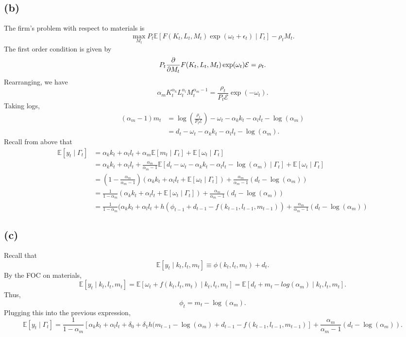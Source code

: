\documentclass[11pt]{article}
\begin{document}
\subsection*{(b)}
The firm's problem with respect to materials is
\[\max_{M_t} P_t \mathbb{E}[F(K_t, L_t, M_t) \exp(\omega_t + \epsilon_t) \mid \Gamma_t] - \rho_t M_t.\]
The first order condition is given by
\[P_t \pdv{M_t} F(K_t, L_t, M_t) \exp(\omega_t) \mathcal{E} = \rho_t.\]
Rearranging, we have
\[\alpha_m K_t^{\alpha_k} L_t^{\alpha_l} M_t^{\alpha_{m} - 1} = \frac{\rho_t}{P_t \mathcal{E}} \exp(-\omega_t).\]
Taking logs,
\begin{align*}
    (\alpha_m - 1) m_t & = \log(\frac{\rho_t}{P_t \mathcal{E}}) - \omega_t - \alpha_k k_t - \alpha_l l_t - \log(\alpha_m) \\
                       & = d_t - \omega_t - \alpha_k k_t - \alpha_l l_t - \log(\alpha_m).
\end{align*} 
Recall from above that
\begin{align*}
    \mathbb{E}[y_t \mid \Gamma_t] & = \alpha_k k_t + \alpha_l l_t + \alpha_m \mathbb{E}[m_t \mid \Gamma_t ] + \mathbb{E}[\omega_t \mid \Gamma_t] \\
                    & = \alpha_k k_t + \alpha_l l_t + \frac{\alpha_m}{\alpha_m - 1} \mathbb{E}[d_t - \omega_t - \alpha_k k_t - \alpha_l l_t - \log(\alpha_m) \mid \Gamma_t] + \mathbb{E}[\omega_t \mid \Gamma_t] \\
                    & = \left( 1 - \frac{\alpha_m}{\alpha_m - 1} \right)(\alpha_k k_t + \alpha_l l_t + \mathbb{E}[\omega_t \mid \Gamma_t]) + \frac{\alpha_m}{\alpha_m - 1} (d_t - \log(\alpha_m)) \\
                    & = \frac{1}{1 - \alpha_m} (\alpha_k k_t + \alpha_l l_t + \mathbb{E}[\omega_t \mid \Gamma_t]) + \frac{\alpha_m}{\alpha_m - 1} (d_t - \log(\alpha_m)) \\
                    & = \frac{1}{1 - \alpha_m} (\alpha_k k_t + \alpha_l l_t + h(\phi_{t-1} + d_{t-1} - f(k_{t-1}, l_{t-1}, m_{t-1})) + \frac{\alpha_m}{\alpha_m - 1} (d_t - \log(\alpha_m))
\end{align*}

\subsection*{(c)}
Recall that
\[\mathbb{E}[y_t \mid k_t, l_t, m_t] \equiv \phi(k_t, l_t, m_t) + d_t.\]
By the FOC on materials,
\[\mathbb{E}[y_t \mid k_t, l_t, m_t] = \mathbb{E}[\omega_t + f(k_t, l_t, m_t) \mid k_t, l_t, m_t] = \mathbb{E}[d_t + m_t - log(\alpha_m) \mid k_t, l_t, m_t]. \]
Thus, 
\[\phi_t = m_t - \log(\alpha_m).\]
Plugging this into the previous expression,
\[\mathbb{E}[y_t \mid \Gamma_t] = \frac{1}{1 - \alpha_m} \left[ \alpha_k k_t + \alpha_l l_t + \delta_0 + \delta_1 h(m_{t-1} - \log(\alpha_m) + d_{t-1} - f(k_{t-1}, l_{t-1}, m_{t-1}) \right]  + \frac{\alpha_m}{\alpha_m - 1} (d_t - \log(\alpha_m)).\]
\end{document}
